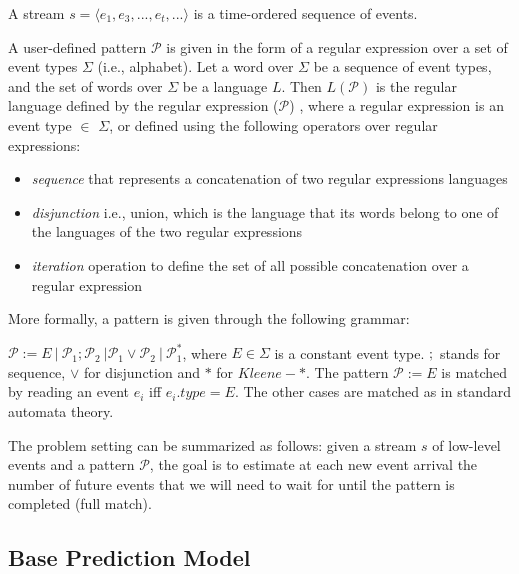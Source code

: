 \begin{definition}
A stream $s=\langle e_1,e_3,...,e_t,...\rangle$  is a time-ordered sequence of events.
\end{definition}


\par A user-defined pattern $\mathcal{P}$ is given in the form of a regular expression over a set of event types $\Sigma$ (i.e., alphabet). Let a word over $\Sigma$ be a sequence of event types, and the set of words over $\Sigma$ be a language $L$. Then $L(\mathcal{P})$ is the regular language defined by the regular expression ($\mathcal{P}$) \cite{hopcroft2006automata,nuel_pattern_2008,alevizos2017event},  where a regular expression is an event type $\in$ $\Sigma$, or defined using the following operators over regular expressions:
 
\begin{itemize}[noitemsep]
	\item \textit{sequence} that represents a concatenation of two regular expressions languages 
	\item \textit{disjunction} i.e., union, which is the language that its words belong to one of the languages of the two regular expressions 
	\item \textit{iteration} operation to define the set of all possible concatenation over a regular expression
\end{itemize}

More formally, a pattern is given through the following grammar:
\begin{definition}
$\mathcal{P} := E\ |\ \mathcal{P}_{1} ; \mathcal{P}_{2}\ | \mathcal{P}_{1} \vee \mathcal{P}_{2}\ |\ \mathcal{P}_{1}^{*}  $, where $E \in \Sigma$ is a constant event type. $;$ stands for sequence, $\vee$ for disjunction and $*$ for $\mathit{Kleene}-*$.
The pattern $\mathcal{P} := E$ is matched by reading an event $e_i$ iff $e_{i}.type = E$.
The other cases are matched as in standard automata theory.
\end{definition}


The problem setting can be summarized as follows: given a stream $s$ of low-level events and a pattern $\mathcal{P}$, 
the goal is to estimate at each new event arrival the number of future events
that we will need to wait for until the pattern is completed (full match).

\subsection{Base Prediction Model}
\label{sec:Event-Forecasting-PMC}

